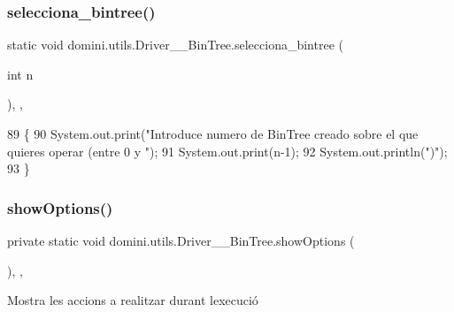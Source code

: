 \subsubsection{\texorpdfstring{selecciona\+\_\+bintree()}{selecciona\_bintree()}}
{\footnotesize\ttfamily static void domini.\+utils.\+Driver\+\_\+\+\_\+\+Bin\+Tree.\+selecciona\+\_\+bintree (\begin{DoxyParamCaption}\item[{int}]{n }\end{DoxyParamCaption})\hspace{0.3cm}{\ttfamily [inline]}, {\ttfamily [static]}, {\ttfamily [private]}}


\begin{DoxyCode}
89                                                   \{
90         System.out.print(\textcolor{stringliteral}{"Introduce numero de BinTree creado sobre el que quieres operar (entre 0 y "});
91         System.out.print(n-1);
92         System.out.println(\textcolor{stringliteral}{")"});
93     \}
\end{DoxyCode}
\mbox{\label{classdomini_1_1utils_1_1Driver____BinTree_aadd7535430d353033b6f35b6d466e018}} 
\subsubsection{\texorpdfstring{show\+Options()}{showOptions()}}
{\footnotesize\ttfamily private static void domini.\+utils.\+Driver\+\_\+\+\_\+\+Bin\+Tree.\+show\+Options (\begin{DoxyParamCaption}{ }\end{DoxyParamCaption})\hspace{0.3cm}{\ttfamily [inline]}, {\ttfamily [static]}, {\ttfamily [private]}}



Mostra les accions a realitzar durant l\textquotesingle{}execució 


